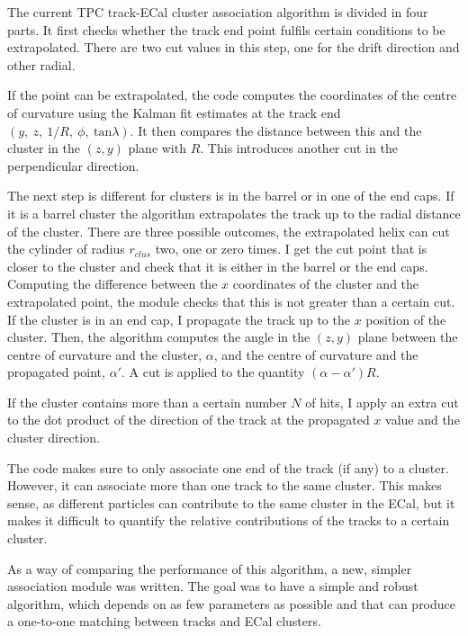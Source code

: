 The current TPC track-ECal cluster association algorithm is divided in four parts. It first checks whether the track end point fulfils certain conditions to be extrapolated. There are two cut values in this step, one for the drift direction and other radial.

If the point can be extrapolated, the code computes the coordinates of the centre of curvature using the Kalman fit estimates at the track end $(y, \ z, \ 1/R, \ \phi, \ \mathrm{tan}\lambda)$. It then compares the distance between this and the cluster in the $(z,y)$ plane with $R$. This introduces another cut in the perpendicular direction.

The next step is different for clusters is in the barrel or in one of the end caps. If it is a barrel cluster the algorithm extrapolates the track up to the radial distance of the cluster. There are three possible outcomes, the extrapolated helix can cut the cylinder of radius $r_{clus}$ two, one or zero times. I get the cut point that is closer to the cluster and check that it is either in the barrel or the end caps. Computing the difference between the $x$ coordinates of the cluster and the extrapolated point, the module checks that this is not greater than a certain cut. If the cluster is in an end cap, I propagate the track up to the $x$ position of the cluster. Then, the algorithm computes the angle in the $(z,y)$ plane between the centre of curvature and the cluster, $\alpha$, and the centre of curvature and the propagated point, $\alpha'$. A cut is applied to the quantity $(\alpha-\alpha')R$.

If the cluster contains more than a certain number $N$ of hits, I apply an extra cut to the dot product of the direction of the track at the propagated $x$ value and the cluster direction.

The code makes sure to only associate one end of the track (if any) to a cluster. However, it can associate more than one track to the same cluster. This makes sense, as different particles can contribute to the same cluster in the ECal, but it makes it difficult to quantify the relative contributions of the tracks to a certain cluster.

As a way of comparing the performance of this algorithm, a new, simpler association module was written. The goal was to have a simple and robust algorithm, which depends on as few parameters as possible and that can produce a one-to-one matching between tracks and ECal clusters.

